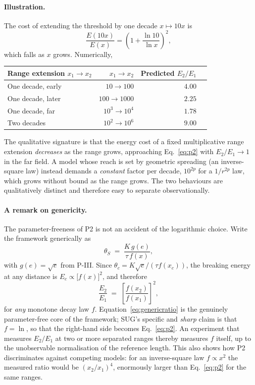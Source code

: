 \documentclass[11pt,a4paper]{article}
\newcommand{\thetaS}{\theta_{S}}
\newcommand{\tgrad}{\tau}
\begin{document}
\paragraph{Illustration.} The cost of extending the threshold by one decade
$x\mapsto 10x$ is
\begin{equation}
  \frac{E(10x)}{E(x)} = \left(1+\frac{\ln 10}{\ln x}\right)^{\!2},
  \label{eq:decade}
\end{equation}
which falls as $x$ grows. Numerically,
\begin{center}
\begin{tabular}{@{}lrrr@{}}
  \toprule
  Range extension $x_1\to x_2$ & $x_1\to x_2$ & Predicted $E_2/E_1$ \\
  \midrule
  One decade, early        & $10 \to 100$     & $4.00$ \\
  One decade, later        & $100 \to 1000$   & $2.25$ \\
  One decade, far          & $10^{3} \to 10^{4}$ & $1.78$ \\
  Two decades              & $10^{2} \to 10^{6}$ & $9.00$ \\
  \bottomrule
\end{tabular}
\end{center}
The qualitative signature is that the energy cost of a fixed multiplicative
range extension \emph{decreases} as the range grows, approaching
Eq.~\eqref{eq:p2} with $E_2/E_1\to 1$ in the far field. A model whose reach
is set by geometric spreading (an inverse-square law) instead demands a
\emph{constant} factor per decade, $10^{2p}$ for a $1/r^{2p}$ law, which grows
without bound as the range grows. The two behaviours are qualitatively
distinct and therefore easy to separate observationally.

\paragraph{A remark on genericity.} The parameter-freeness of P2 is not an
accident of the logarithmic choice. Write the framework generically as
\begin{equation}
  \thetaS \;=\; \frac{K\,g(e)}{\tgrad\,f(x)},
  \label{eq:generic}
\end{equation}
with $g(e)=\sqrt{e}$ from P-III. Since $\theta_c = K\sqrt{e}/(\tgrad f(x_c))$,
the breaking energy at any distance is $E_c \propto \bigl[f(x)\bigr]^{2}$, and
therefore
\begin{equation}
  \frac{E_2}{E_1} \;=\; \left[\frac{f(x_2)}{f(x_1)}\right]^{\!2},
  \label{eq:genericratio}
\end{equation}
for \emph{any} monotone decay law $f$. Equation~\eqref{eq:genericratio} is the
genuinely parameter-free core of the framework; SUG's specific and
\emph{sharp} claim is that $f=\ln$, so that the right-hand side becomes
Eq.~\eqref{eq:p2}. An experiment that measures $E_2/E_1$ at two or more
separated ranges thereby measures $f$ itself, up to the unobservable
normalisation of the reference length. This also shows how P2 discriminates
against competing models: for an inverse-square law $f \propto x^{2}$ the
measured ratio would be $(x_2/x_1)^{4}$, enormously larger than
Eq.~\eqref{eq:p2} for the same ranges.
\end{document}
